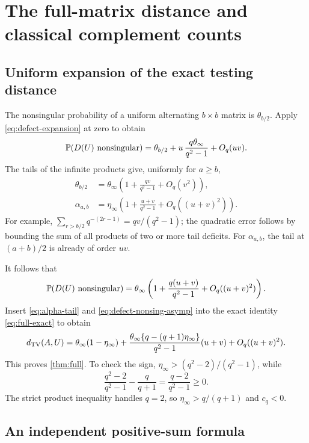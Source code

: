 \section{The full-matrix distance and classical complement counts}
\label{sec:full-distance}

\subsection{Uniform expansion of the exact testing distance}

The nonsingular probability of a uniform alternating \(b\times b\)
matrix is \(\theta_{b/2}\). Apply
\eqref{eq:defect-expansion} at zero to obtain
\[
 \mathbb P(D(U)\text{ nonsingular})
    =\theta_{b/2}+u\,\frac{q\theta_\infty}{q^2-1}
                  +O_q(uv).
\]
The tails of the infinite products give, uniformly for \(a\ge b\),
\begin{align}
 \theta_{b/2}
   &=\theta_\infty\left(1+\frac{qv}{q^2-1}
                                  +O_q(v^2)\right),\label{eq:theta-tail}\\
 \alpha_{a,b}
   &=\eta_\infty\left(1+\frac{u+v}{q^2-1}
                                  +O_q((u+v)^2)\right).\label{eq:alpha-tail}
\end{align}
For example,
\(\sum_{r>b/2}q^{-(2r-1)}=qv/(q^2-1)\);
the quadratic error follows by bounding the sum of all products of
two or more tail deficits. For \(\alpha_{a,b}\), the tail at
\((a+b)/2\) is already of order \(uv\).

It follows that
\begin{equation}\label{eq:defect-nonsing-asymp}
 \mathbb P(D(U)\text{ nonsingular})
  =\theta_\infty
       \left(1+\frac{q(u+v)}{q^2-1}
                    +O_q((u+v)^2)\right).
\end{equation}
Insert \eqref{eq:alpha-tail} and \eqref{eq:defect-nonsing-asymp} into the exact
identity \eqref{eq:full-exact} to obtain
\[
 d_{\mathrm{TV}}(A,U)
 =\theta_\infty(1-\eta_\infty)
  +\frac{\theta_\infty\{q-(q+1)\eta_\infty\}}{q^2-1}
          (u+v)+O_q((u+v)^2).
\]
This proves \cref{thm:full}.
To check the sign, \(\eta_\infty>(q^2-2)/(q^2-1)\), while
\[
 \frac{q^2-2}{q^2-1}-\frac q{q+1}
     =\frac{q-2}{q^2-1}\ge0.
\]
The strict product inequality handles \(q=2\), so
\(\eta_\infty>q/(q+1)\) and \(c_q<0\).

\subsection{An independent positive-sum formula}

